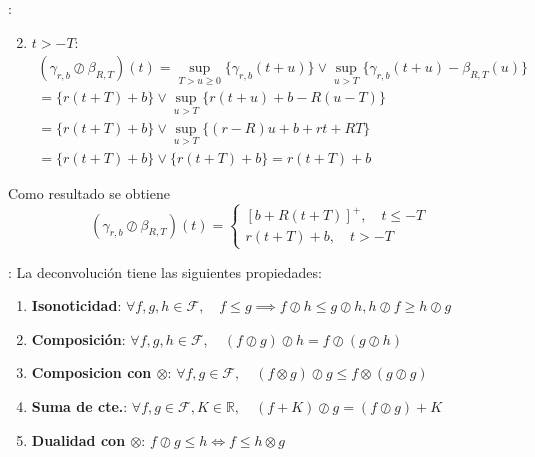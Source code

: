 \documentclass[xcolor={x11names}]{beamer}
\begin{document}
\begin{frame}{\secname: \subsecname}
    \begin{enumerate}
        \setcounter{enumi}{1}
        \item $t>-T$:
        \begin{multline*}
        (\gamma_{r,b}
        \oslash
        \beta_{R,T})(t)
        =\sup_{T>u \geq0}
        \{
        \gamma_{r,b}(t+u)
        \}
        \lor
        \sup_{u>T}
        \{
        \gamma_{r,b}(t+u)
        -
        \beta_{R,T}(u)
        \}\\
        =\{ r(t+T)+b \}
        \lor
        \sup_{u>T}\{
            r(t+u)+b
            -R(u-T)
        \}\\
        =\{ r(t+T)+b \}
        \lor
        \sup_{u>T}\{
            (r-R)u+b
            +rt+RT
        \}\\
        =\{ r(t+T)+b \}
        \lor
        \{
            r(t+T)+b
        \}
        =r(t+T)+b
        \end{multline*}
    \end{enumerate}

    \pause
    Como resultado se obtiene
    \begin{equation*}
        (\gamma_{r,b}
        \oslash
        \beta_{R,T})(t)
        =
        \begin{cases}
            [b+R(t+T)]^+,\quad t\leq -T\\
            r(t+T)+b,\quad t>-T
        \end{cases}
    \end{equation*}
\end{frame}



\begin{frame}{\secname: \subsecname}
    La deconvolución tiene las siguientes
    propiedades:
    \begin{enumerate}
        \item \textbf{Isonoticidad}:
            $\forall f,g,h\in\mathcal{F},\quad
            f\leq g\implies
            f\oslash h\leq g\oslash h,
            h\oslash f\geq h\oslash g$
        \item \textbf{Composición}:
            $\forall f,g,h\in\mathcal{F},\quad
            (f\oslash g)\oslash h
            =
            f\oslash (g\oslash h)
            $
        \item \textbf{Composicion con $\otimes$}:
            $\forall f,g\in\mathcal{F},\quad
            (f\otimes g)\oslash g
            \leq
            f\otimes (g\oslash g)
            $
        \item \textbf{Suma de cte.}:
            $\forall f,g\in\mathcal{F},K\in\mathbb{R},\quad
            (f+K)\oslash g
            =
            (f\oslash g)+K
            $
        \item \textbf{Dualidad con $\otimes$}:
            $f \oslash g\leq h
            \iff f\leq h\otimes g$
    \end{enumerate}
\end{frame}
\end{document}
